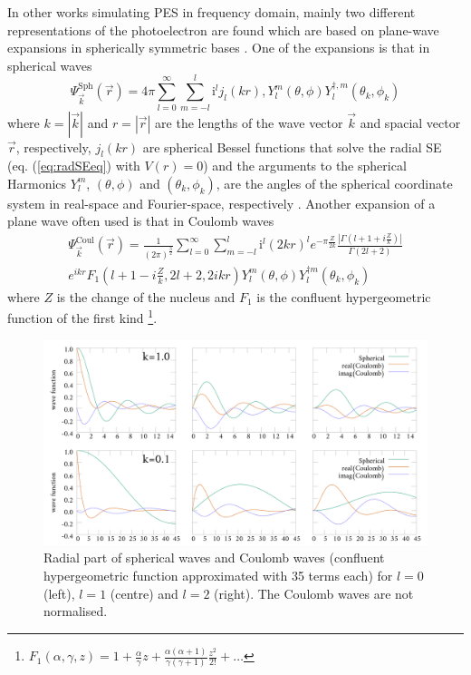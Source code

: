 In other works simulating PES in frequency domain, mainly two different representations of the photoelectron are found which are based on plane-wave expansions in spherically symmetric bases \cite{ezDyson,DO_TDDFT,do_modCoul}.
One of the expansions is that in spherical waves \cite{Lifschitz}
\begin{equation} \label{eq:spherWave}
\Psi^\text{Sph}_{\vec{k}}(\vec{r})=4\pi
\sum_{l=0}^\infty \sum_{m=-l}^l \text{i}^l j_l\left(kr\right), Y_l^m\left(\theta, \phi\right) Y^{\dagger,m}_l\left(\theta_k, \phi_k\right)
\end{equation}
where $k=|\vec{k}|$ and $r=|\vec{r}|$ are the lengths of the wave vector $\vec{k}$ and spacial vector $\vec{r}$, respectively, $j_l(kr)$ are spherical Bessel functions that solve the radial SE (eq. (\ref{eq:radSEeq}) with $V(r)=0$) and the arguments to the spherical Harmonics $Y_l^m$, $(\theta,\phi)$ and $(\theta_k,\phi_k)$, are the angles of the spherical coordinate system in real-space and Fourier-space, respectively \cite{ezDyson}.
Another expansion of a plane wave often used is that in Coulomb waves
\begin{multline} \label{eq:CoulWave}
\Psi^\text{Coul}_{\vec{k}}(\vec{r})=\frac{1}{(2\pi)^{\frac{3}{2}}}
\sum_{l=0}^\infty \sum_{m=-l}^l \text{i}^l (2kr)^l e^{-\pi\frac{Z}{2k}} \frac{|\Gamma(l+1+i\frac{Z}{k})|}{\Gamma(2l+2)} \\
e^{ikr} F_1(l+1-i\frac{Z}{k}, 2l+2, 2ikr) 
Y_l^m\left(\theta, \phi\right) Y^{\dagger m}_l\left(\theta_k, \phi_k\right)
\end{multline}
where $Z$ is the change of the nucleus and $F_1$ is the confluent hypergeometric function of the first kind \cite{do_modCoul,ColWave} \footnote{$F_1(\alpha,\gamma,z)=1+\frac{\alpha}{\gamma}z + \frac{\alpha (\alpha+1)}{\gamma (\gamma+1)} \frac{z^2}{2!}+\hdots $}.
\begin{figure}
\includegraphics[width=\textwidth]{Figures/RBF/RadialPart}
\caption{Radial part of spherical waves and Coulomb waves (confluent hypergeometric function approximated with 35 terms each) for $l=0$ (left), $l=1$ (centre) and $l=2$ (right).
The Coulomb waves are not normalised.}
\label{fig:RadFun}
\end{figure}

